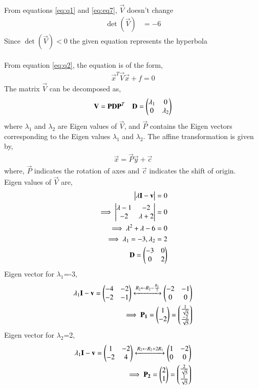 \documentclass[journal,12pt,twocolumn]{IEEEtran}
\begin{document}
\\
From equations \eqref{eq:q1} and \eqref{eq:eq7}, $\vec{V}$ doesn't change
\begin{align}
    \det(\vec{V})&=-6
\end{align}
Since $\det(\vec{V})<0$ the given equation represents the hyperbola\\
\\
From equation \eqref{eq:q2}, the equation is of the form,
\begin{align}
    \vec{x}^T\vec{V}\vec{x}+f=0
\end{align}
The matrix $\vec{V}$ can be decomposed as,
\begin{align}
    \mathbf{V} = \mathbf{P}\mathbf{D}\mathbf{P}^T \quad \mathbf{D}=\begin{pmatrix}\lambda_1&0\\0&\lambda_2\end{pmatrix}
\end{align}
where $\lambda_1$ and $\lambda_2$ are Eigen values of $\vec{V}$, and $\vec{P}$ contains the Eigen vectors corresponding to the Eigen values $\lambda_1$ and $\lambda_2$. The affine transformation is given by,
\begin{align}
    \vec{x} = \vec{P}\vec{y}+\vec{c}
\end{align}
where, $\vec{P}$ indicates the rotation of axes and $\vec{c}$ indicates the shift of origin.\\
Eigen values of $\vec{V}$ are,
\begin{align}
   \begin{vmatrix}\lambda\mathbf{I}-\mathbf{v}\end{vmatrix}=0\\
    \implies \begin{vmatrix}\lambda-1&-2\\-2&\lambda+2\end{vmatrix}=0\\
    \implies \lambda^2+\lambda-6=0\\
    \implies \lambda_1=-3,\lambda_2=2\\
    \mathbf{D}=\begin{pmatrix}-3&0\\0&2\end{pmatrix}
\end{align}
Eigen vector for $\lambda_1$=-3,
\begin{align}
    \lambda_1\mathbf{I}-\mathbf{v}=\begin{pmatrix}-4&-2\\-2&-1\end{pmatrix}\xleftrightarrow[]{R_2\leftarrow R_2-\frac{R_1}{2}}\begin{pmatrix}-2&-1\\0&0\end{pmatrix}\\
    \implies \mathbf{P_1}=\begin{pmatrix}1\\-2\end{pmatrix}=\begin{pmatrix}\frac{1}{\sqrt{5}}\\\frac{-2}{\sqrt{5}}\end{pmatrix}
\end{align}
Eigen vector for $\lambda_2$=2,
\begin{align}
    \lambda_1\mathbf{I}-\mathbf{v}=\begin{pmatrix}1&-2\\-2&4\end{pmatrix}\xleftrightarrow[]{R_2\leftarrow R_2+2R_1}\begin{pmatrix}1&-2\\0&0\end{pmatrix}\\
    \implies \mathbf{P_2}=\begin{pmatrix}2\\1\end{pmatrix}=\begin{pmatrix}\frac{2}{\sqrt{5}}\\\frac{1}{\sqrt{5}}\end{pmatrix}
\end{align}
\end{document}
